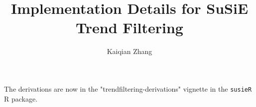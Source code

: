 \documentclass[11pt,authoryear]{article}
\begin{document}
\singlespacing
\title{Implementation Details for SuSiE Trend Filtering}
\author{Kaiqian Zhang}
\maketitle

The derivations are now in the "trendfiltering-derivations" vignette in the {\tt susieR} R package.
\end{document}
